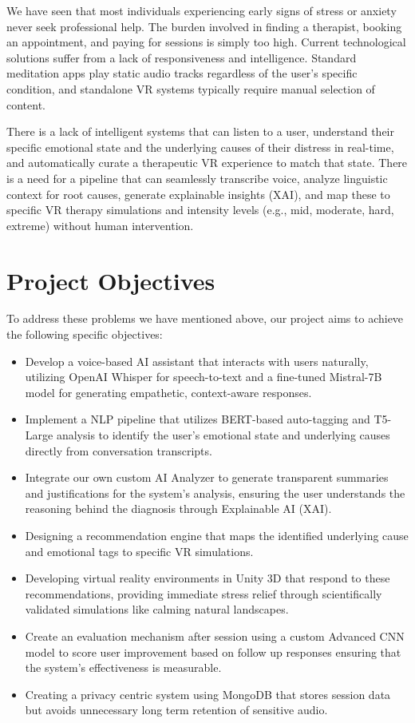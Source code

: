 We have seen that most individuals experiencing early signs of stress or anxiety never seek professional help. The burden involved in finding a therapist, booking an appointment, and paying for sessions is simply too high. Current technological solutions suffer from a lack of responsiveness and intelligence. Standard meditation apps play static audio tracks regardless of the user's specific condition, and standalone VR systems typically require manual selection of content.

There is a lack of intelligent systems that can listen to a user, understand their specific emotional state and the underlying causes of their distress in real-time, and automatically curate a therapeutic VR experience to match that state. There is a need for a pipeline that can seamlessly transcribe voice, analyze linguistic context for root causes, generate explainable insights (XAI), and map these to specific VR therapy simulations and intensity levels (e.g., mid, moderate, hard, extreme) without human intervention.

\section{Project Objectives}

To address these problems we have mentioned above, our project aims to achieve the following specific
objectives:

\begin{itemize}
    \item Develop a voice-based AI assistant that interacts with users naturally, utilizing OpenAI Whisper for speech-to-text and a fine-tuned Mistral-7B model for generating empathetic, context-aware responses.
    \item Implement a NLP pipeline that utilizes BERT-based auto-tagging and T5-Large analysis to identify the user's emotional state and underlying causes directly from conversation transcripts.
    \item Integrate our own custom AI Analyzer to generate transparent summaries and justifications for the system's analysis, ensuring the user understands the reasoning behind the diagnosis through Explainable AI (XAI).
    \item Designing a recommendation engine that maps the identified underlying cause and emotional tags to specific VR simulations.
    \item Developing virtual reality environments in Unity 3D that respond to these recommendations, providing immediate stress relief through scientifically validated simulations like calming natural landscapes.
    \item Create an evaluation mechanism after session using a custom Advanced CNN model to score user improvement based on follow up responses ensuring that the system's effectiveness is measurable.
    \item Creating a privacy centric system using MongoDB that stores session data but avoids unnecessary long term retention of sensitive audio.
\end{itemize}

